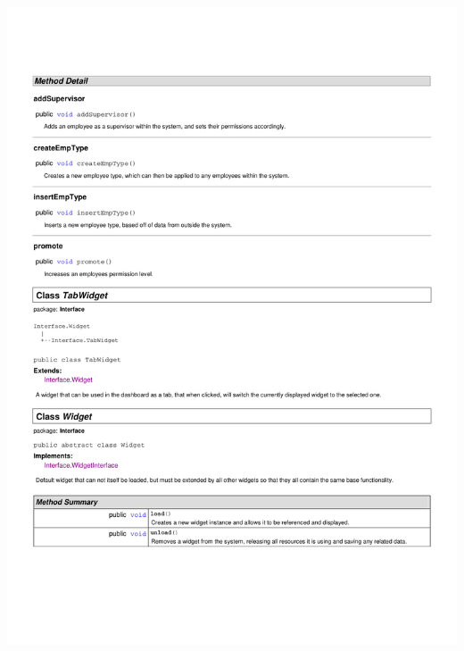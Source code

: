 \documentclass[letterpaper,12pt]{report}
\begin{document}
\includegraphics[scale=0.9,trim=20mm 30mm 25mm 25mm]{externals/InterfaceDataDictionary10.pdf}
\newpage
\end{document}
